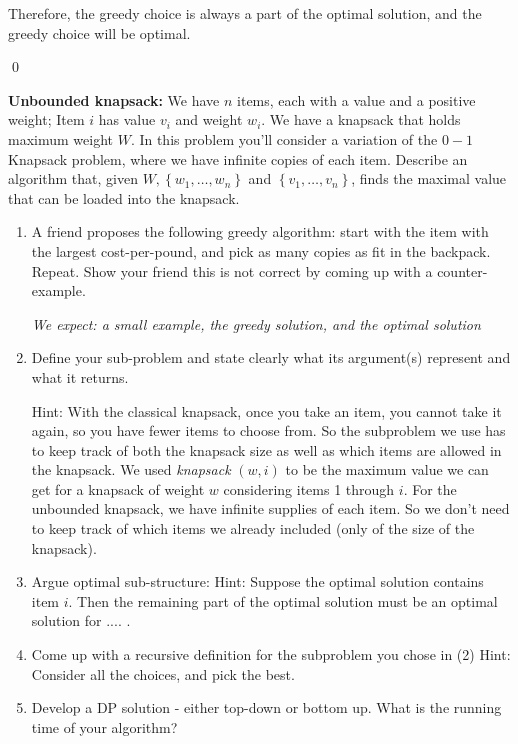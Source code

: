 \documentclass{report}
\begin{document}
\begin{enumerate}
\begin{enumerate}
      Therefore, the greedy choice is always a part of the optimal solution, and the greedy choice will be optimal. \\

    \end{enumerate}

  \end{enumerate}

  \qed


\newpage
    \qs {} {
\textbf{Unbounded knapsack:} We have $n$ items, each with a value and a positive weight; Item $i$ has value $v_i$ and weight $w_i$. We have a knapsack that holds maximum weight $W$. In this problem you'll consider a variation of the $0-1$ Knapsack problem, where we have infinite copies of each item. Describe an algorithm that, given $W,\left\{w_1, \ldots, w_n\right\}$ and $\left\{v_1, \ldots, v_n\right\}$, finds the maximal value that can be loaded into the knapsack.

  \begin{enumerate}
    \item A friend proposes the following greedy algorithm: start with the item with the largest cost-per-pound, and pick as many copies as fit in the backpack. Repeat.
Show your friend this is not correct by coming up with a counter-example.

    \textit{We expect: a small example, the greedy solution, and the optimal solution}
    \item Define your sub-problem and state clearly what its argument(s) represent and what it returns.

      Hint: With the classical knapsack, once you take an item, you cannot take it again, so you have fewer items to choose from. So the subproblem we use has to keep track of both the knapsack size as well as which items are allowed in the knapsack. We used \emph{knapsack} $(w, i)$ to be the maximum value we can get for a knapsack of weight $w$ considering items 1 through $i$. For the unbounded knapsack, we have infinite supplies of each item. So we don't need to keep track of which items we already included (only of the size of the knapsack).

    \item Argue optimal sub-structure:
      Hint: Suppose the optimal solution contains item $i$. Then the remaining part of the optimal solution must be an optimal solution for .... .

    \item Come up with a recursive definition for the subproblem you chose in (2)
    Hint: Consider all the choices, and pick the best.

  \item Develop a DP solution - either top-down or bottom up. What is the running time of your algorithm?

  \end{enumerate}
    }
\end{document}
